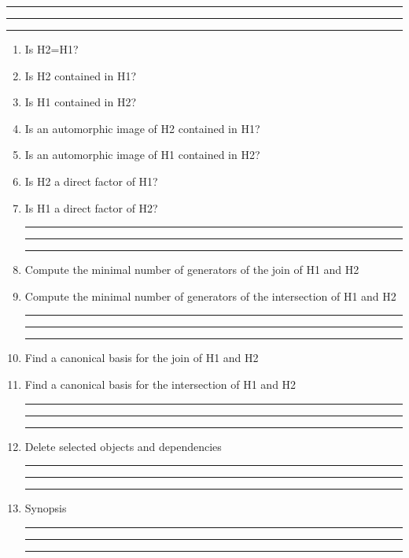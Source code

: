 
\bigskip
\hrule\hrule\hrule

\begin{enumerate}

\item Is H2=H1?

\item Is H2 contained in H1?

\item Is H1 contained in H2?

\item Is an automorphic image of H2 contained in H1?

\item Is an automorphic image of H1 contained in H2?

\item Is H2 a direct factor of H1?

\item Is H1 a direct factor of H2?

\bigskip
\hrule\hrule\hrule

\item Compute the minimal number of generators of the join of H1 and H2

\item Compute the minimal number of generators of the intersection of H1 and H2

\bigskip
\hrule\hrule\hrule

\item Find a  canonical basis for the join of H1 and H2

\item Find a canonical basis for the intersection of H1 and H2

\bigskip
\hrule\hrule\hrule

\item Delete selected objects and dependencies

\bigskip
\hrule\hrule\hrule

\item
Synopsis

\bigskip
\hrule\hrule\hrule

\end{enumerate}
